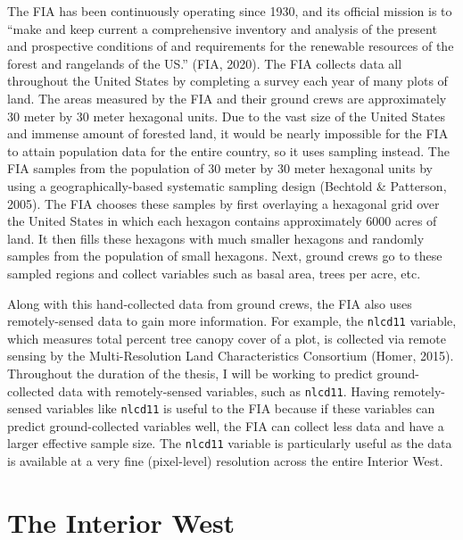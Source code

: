 \documentclass[12pt,twoside]{reedthesis}
\begin{document}
The FIA has been continuously operating since 1930, and its official mission is to ``make and keep current a comprehensive inventory and analysis of the present and prospective conditions of and requirements for the renewable resources of the forest and rangelands of the US.'' (FIA, 2020). The FIA collects data all throughout the United States by completing a survey each year of many plots of land. The areas measured by the FIA and their ground crews are approximately 30 meter by 30 meter hexagonal units. Due to the vast size of the United States and immense amount of forested land, it would be nearly impossible for the FIA to attain population data for the entire country, so it uses sampling instead. The FIA samples from the population of 30 meter by 30 meter hexagonal units by using a geographically-based systematic sampling design (Bechtold \& Patterson, 2005). The FIA chooses these samples by first overlaying a hexagonal grid over the United States in which each hexagon contains approximately 6000 acres of land. It then fills these hexagons with much smaller hexagons and randomly samples from the population of small hexagons. Next, ground crews go to these sampled regions and collect variables such as basal area, trees per acre, etc.

Along with this hand-collected data from ground crews, the FIA also uses remotely-sensed data to gain more information. For example, the \texttt{nlcd11} variable, which measures total percent tree canopy cover of a plot, is collected via remote sensing by the Multi-Resolution Land Characteristics Consortium (Homer, 2015). Throughout the duration of the thesis, I will be working to predict ground-collected data with remotely-sensed variables, such as \texttt{nlcd11}. Having remotely-sensed variables like \texttt{nlcd11} is useful to the FIA because if these variables can predict ground-collected variables well, the FIA can collect less data and have a larger effective sample size. The \texttt{nlcd11} variable is particularly useful as the data is available at a very fine (pixel-level) resolution across the entire Interior West.

\hypertarget{the-interior-west}{%
\section{The Interior West}\label{the-interior-west}}
\end{document}
